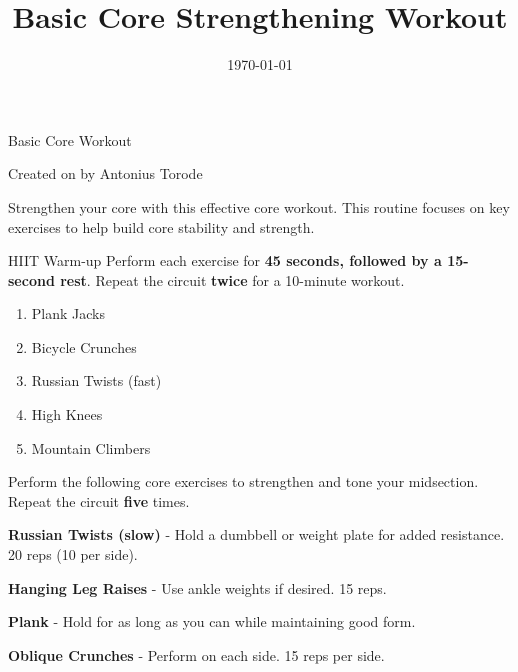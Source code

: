 \documentclass{article}
\newcounter{workout}
\newcounter{exercise}
\renewcommand{\maketitle}{
	\begin{center}
		{\Huge\bfseries\thetitle}
		
		\vspace{0.5em}
		
		Basic Core Workout
		
		\vspace{0.5em}
		
		Created on \thedate\hspace{0.5em}by Antonius Torode
	\end{center}
}
\begin{document}
	\begin{tcolorbox}[colback=gray!15,colframe=black,enforce breakable,pad at break*=5mm,boxrule=0.5mm]
		
		\title{Basic Core Strengthening Workout}
		\date{\today}
		\maketitle
		
		Strengthen your core with this effective core workout. This routine focuses on key exercises to help build core stability and strength.
		
		\begin{workoutbox}{HIIT Warm-up}
			Perform each exercise for \textbf{45 seconds, followed by a 15-second rest}. Repeat the circuit \textbf{twice} for a 10-minute workout.
			
			\begin{enumerate}
				\item Plank Jacks
				\item Bicycle Crunches
				\item Russian Twists (fast)
				\item High Knees
				\item Mountain Climbers
			\end{enumerate}
		\end{workoutbox}
		
		Perform the following core exercises to strengthen and tone your midsection. Repeat the circuit \textbf{five} times.
		
		\begin{exercisebox}
			\textbf{Russian Twists (slow)} - Hold a dumbbell or weight plate for added resistance. 20 reps (10 per side).
		\end{exercisebox}
		
		\begin{exercisebox}
			\textbf{Hanging Leg Raises} - Use ankle weights if desired. 15 reps.
		\end{exercisebox}
		
		\begin{exercisebox}
			\textbf{Plank} - Hold for as long as you can while maintaining good form.
		\end{exercisebox}
		
		\begin{exercisebox}
			\textbf{Oblique Crunches} - Perform on each side. 15 reps per side.
		\end{exercisebox}
		

\end{tcolorbox}
\end{document}
